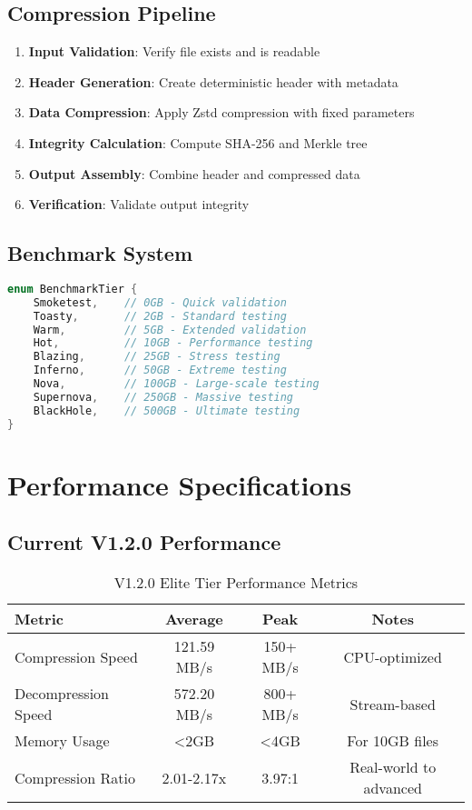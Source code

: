 \documentclass[12pt,a4paper]{article}
\begin{document}
\subsection{Compression Pipeline}
\begin{enumerate}
    \item \textbf{Input Validation}: Verify file exists and is readable
    \item \textbf{Header Generation}: Create deterministic header with metadata
    \item \textbf{Data Compression}: Apply Zstd compression with fixed parameters
    \item \textbf{Integrity Calculation}: Compute SHA-256 and Merkle tree
    \item \textbf{Output Assembly}: Combine header and compressed data
    \item \textbf{Verification}: Validate output integrity
\end{enumerate}

\subsection{Benchmark System}
\begin{lstlisting}[language=Rust, caption=Performance Tiers]
enum BenchmarkTier {
    Smoketest,    // 0GB - Quick validation
    Toasty,       // 2GB - Standard testing
    Warm,         // 5GB - Extended validation
    Hot,          // 10GB - Performance testing
    Blazing,      // 25GB - Stress testing
    Inferno,      // 50GB - Extreme testing
    Nova,         // 100GB - Large-scale testing
    Supernova,    // 250GB - Massive testing
    BlackHole,    // 500GB - Ultimate testing
}
\end{lstlisting}

\newpage

\section{Performance Specifications}

\subsection{Current V1.2.0 Performance}
\begin{table}[h]
\centering
\begin{tabular}{|l|c|c|c|}
\hline
\textbf{Metric} & \textbf{Average} & \textbf{Peak} & \textbf{Notes} \\
\hline
Compression Speed & 121.59 MB/s & 150+ MB/s & CPU-optimized \\
Decompression Speed & 572.20 MB/s & 800+ MB/s & Stream-based \\
Memory Usage & <2GB & <4GB & For 10GB files \\
Compression Ratio & 2.01-2.17x & 3.97:1 & Real-world to advanced \\
\hline
\end{tabular}
\caption{V1.2.0 Elite Tier Performance Metrics}
\end{table}
\end{document}
